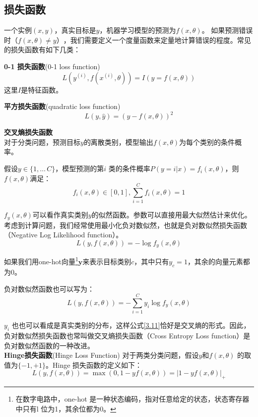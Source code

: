\documentclass[11pt,fleqn, UTF8]{ctexbook} %
\begin{document}
\subsection{损失函数}
一个实例$(x, y)$，真实目标是$y$，机器学习模型的预测为$f(x, \theta)$。 如果预测错误时（$f(x, \theta) \not= y）$，我们需要定义一个度量函数来定量地计算错误的程度。常见的损失函数有如下几类：

\textbf{0-1 损失函数}(0-1 loss function)
\begin{equation}\label{3.7}
  L(y^{(i)}, f(x^{(i)}, \theta))=I(y=f(x,\theta))
\end{equation}
这里$I$是特征函数。

\textbf{平方损失函数}(quadratic loss function)
\begin{equation}\label{3.8}
  L(y,\hat{y})=(y-f(x,\theta))^2
\end{equation}

\textbf{交叉熵损失函数}\\
对于分类问题，预测目标$y$的离散类别，模型输出$f(x,\theta)$为每个类别的条件概率。

假设$y\in \{1,\dots\,C\}$，模型预测的第$i$ 类的条件概率$P(y=i|x)=f_i(x,\theta)$，则$f(x,\theta)$满足：
\begin{equation}\label{3.9}
  f_i(x,\theta)\in [0,1],   \sum_{i=1}^C f_i(x,\theta)=1
\end{equation}

$f_y(x,\theta)$可以看作真实类别$y$的似然函数。参数可以直接用最大似然估计来优化。考虑到计算问题，我们经常使用最小化负对数似然，也就是负对数似然损失函数（Negative Log Likelihood function）。
\begin{equation}\label{3.10}
  L(y,f(x,\theta))=-\log f_y(x,\theta)
\end{equation}

如果我们用one-hot向量\footnote{在数字电路中，one-hot 是一种状态编码，指对任意给定的状态，状态寄存器中只有l 位为1，其余位都为0。}$\boldsymbol{y}$来表示目标类别$c$，其中只有$y_c = 1$，其余的向量元素都为0。

负对数似然函数也可以写为：
\begin{equation}\label{3.11}
  L(y,f(x,\theta))=-\sum_{i=1}^C y_i \log f_y(x,\theta)
\end{equation}

$y_i$ 也也可以看成是真实类别的分布，这样公式\ref{3.11}恰好是交叉熵的形式。因此，负对数似然损失函数也常叫做交叉熵损失函数（Cross Entropy Loss function）是负对数似然函数的一种改进。
\\

\textbf{Hinge损失函数}(Hinge Loss Function)
对于两类分类问题，假设$y$和$f(x, \theta)$ 的取值为$\{-1,+1\}$。Hinge 损失函数的定义如下：
\begin{equation}\label{3.12}
  L(y,f(x,\theta))=\max(0,1-yf(x,\theta))=|1-yf(x,\theta)|_+
\end{equation}
\end{document}
